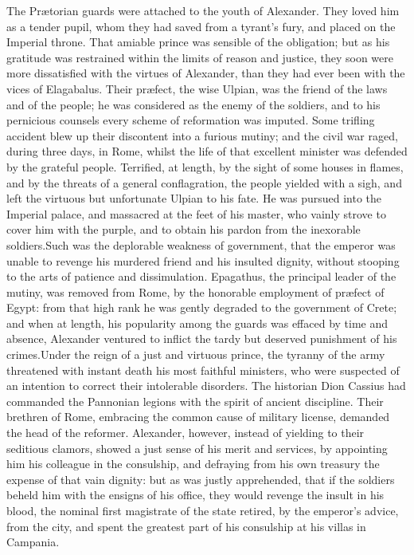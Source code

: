 The Prætorian guards were attached to the youth of Alexander.
They loved him as a tender pupil, whom they had saved from a
tyrant’s fury, and placed on the Imperial throne. That amiable
prince was sensible of the obligation; but as his gratitude was
restrained within the limits of reason and justice, they soon
were more dissatisfied with the virtues of Alexander, than they
had ever been with the vices of Elagabalus. Their præfect, the
wise Ulpian, was the friend of the laws and of the people; he was
considered as the enemy of the soldiers, and to his pernicious
counsels every scheme of reformation was imputed. Some trifling
accident blew up their discontent into a furious mutiny; and the
civil war raged, during three days, in Rome, whilst the life of
that excellent minister was defended by the grateful people.
Terrified, at length, by the sight of some houses in flames, and
by the threats of a general conflagration, the people yielded
with a sigh, and left the virtuous but unfortunate Ulpian to his
fate. He was pursued into the Imperial palace, and massacred at
the feet of his master, who vainly strove to cover him with the
purple, and to obtain his pardon from the inexorable soldiers.\footnotemark[731]
Such was the deplorable weakness of government, that the
emperor was unable to revenge his murdered friend and his
insulted dignity, without stooping to the arts of patience and
dissimulation. Epagathus, the principal leader of the mutiny, was
removed from Rome, by the honorable employment of præfect of
Egypt: from that high rank he was gently degraded to the
government of Crete; and when at length, his popularity among the
guards was effaced by time and absence, Alexander ventured to
inflict the tardy but deserved punishment of his crimes.\footnotemark[74] Under
the reign of a just and virtuous prince, the tyranny of the army
threatened with instant death his most faithful ministers, who
were suspected of an intention to correct their intolerable
disorders. The historian Dion Cassius had commanded the Pannonian
legions with the spirit of ancient discipline. Their brethren of
Rome, embracing the common cause of military license, demanded
the head of the reformer. Alexander, however, instead of yielding
to their seditious clamors, showed a just sense of his merit and
services, by appointing him his colleague in the consulship, and
defraying from his own treasury the expense of that vain dignity:
but as was justly apprehended, that if the soldiers beheld him
with the ensigns of his office, they would revenge the insult in
his blood, the nominal first magistrate of the state retired, by
the emperor’s advice, from the city, and spent the greatest part
of his consulship at his villas in Campania.\footnotemark[75] \footnotemark[751]

